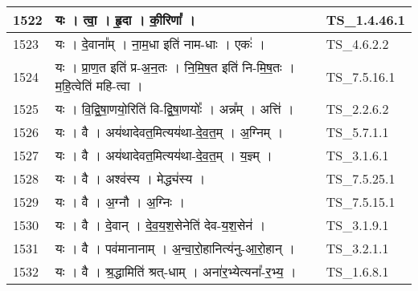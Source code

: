 \documentclass[17pt]{extarticle}
\begin{document}
\begin{longtable}{||p{0.4in}||p{4.9in}||p{0.9in}||}
    \hline
        
    1522 & यः   ।   त्वा॒   ।   हृ॒दा   ।   की॒रिणा᳚   ।    & TS\_1.4.46.1       \\
    
    \hline
        
    1523 & यः   ।   दे॒वाना᳚म्   ।   ना॒म॒धा इति॑ नाम{-}धाः   ।   एकः॑   ।    & TS\_4.6.2.2       \\
    
    \hline
        
    1524 & यः   ।   प्रा॒ण॒त इति॑ प्र{-}अ॒न॒तः   ।   नि॒मि॒ष॒त इति॑ नि{-}मि॒ष॒तः   ।   म॒हि॒त्वेति॑ महि{-}त्वा   ।    & TS\_7.5.16.1       \\
    
    \hline
        
    1525 & यः   ।   वि॒द्वि॒षा॒णयो॒रिति॑ वि{-}द्वि॒षा॒णयोः᳚   ।   अन्न᳚म्   ।   अत्ति॑   ।    & TS\_2.2.6.2       \\
    
    \hline
        
    1526 & यः   ।   वै   ।   अय॑थादेवत॒मित्यय॑था{-}दे॒व॒त॒म्   ।   अ॒ग्निम्   ।    & TS\_5.7.1.1       \\
    
    \hline
        
    1527 & यः   ।   वै   ।   अय॑थादेवत॒मित्यय॑था{-}दे॒व॒त॒म्   ।   य॒ज्ञ्म्   ।    & TS\_3.1.6.1       \\
    
    \hline
        
    1528 & यः   ।   वै   ।   अश्व॑स्य   ।   मेद्ध्य॑स्य   ।    & TS\_7.5.25.1       \\
    
    \hline
        
    1529 & यः   ।   वै   ।   अ॒ग्नौ   ।   अ॒ग्निः   ।    & TS\_7.5.15.1       \\
    
    \hline
        
    1530 & यः   ।   वै   ।   दे॒वान्   ।   दे॒व॒य॒श॒सेनेति॑ देव{-}य॒श॒सेन॑   ।    & TS\_3.1.9.1       \\
    
    \hline
        
    1531 & यः   ।   वै   ।   पव॑मानानाम्   ।   अ॒न्वा॒रो॒हानित्य॑नु{-}आ॒रो॒हान्   ।    & TS\_3.2.1.1       \\
    
    \hline
        
    1532 & यः   ।   वै   ।   श्र॒द्धामिति॑ श्रत्{-}धाम्   ।   अना॑र॒भ्येत्यना᳚{-}र॒भ्य॒   ।    & TS\_1.6.8.1       \\
    

\end{longtable}
\end{document}
